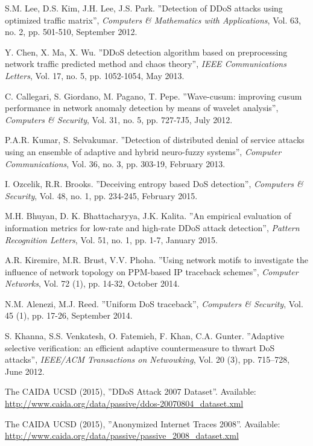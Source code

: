 \begin{thebibliography}{11}
S.M. Lee, D.S. Kim, J.H. Lee, J.S. Park. ''Detection of DDoS attacks using optimized traffic matrix'', \textit{Computers \& Mathematics with Applications}, Vol. 63, no. 2, pp. 501-510, September 2012.

Y. Chen, X. Ma, X. Wu. ''DDoS detection algorithm based on preprocessing network traffic predicted method and chaos theory'', \textit{IEEE Communications Letters}, Vol. 17, no. 5, pp. 1052-1054, May 2013.

C. Callegari, S. Giordano, M. Pagano, T. Pepe. ''Wave-cusum: improving cusum performance in network anomaly detection by means of wavelet analysis'', \textit{Computers \& Security}, Vol. 31, no. 5, pp. 727-7J5, July 2012.

P.A.R. Kumar, S. Selvakumar. ''Detection of distributed denial of service attacks using an ensemble of adaptive and hybrid neuro-fuzzy systems'', \textit{Computer Communications}, Vol. 36, no. 3, pp. 303-19, February 2013.

I. Ozcelik, R.R. Brooks. ''Deceiving entropy based DoS detection'', \textit{Computers \& Security}, Vol. 48, no. 1, pp. 234-245, February 2015.

M.H. Bhuyan, D. K. Bhattacharyya, J.K. Kalita. ''An empirical evaluation of information metrics for low-rate and high-rate DDoS attack detection'', \textit{Pattern Recognition Letters}, Vol. 51, no. 1, pp. 1-7, January 2015.

A.R. Kiremire, M.R. Brust, V.V. Phoha. ''Using network motifs to investigate the influence of network topology on PPM-based IP traceback schemes'', \textit{Computer Networks}, Vol. 72 (1), pp. 14-32, October 2014.

N.M. Alenezi, M.J. Reed. ''Uniform DoS traceback'', \textit{Computers \& Security}, Vol. 45 (1), pp. 17-26, September 2014.

S. Khanna, S.S. Venkatesh, O. Fatemieh, F. Khan, C.A. Gunter. ''Adaptive selective verification: an efficient adaptive countermeasure to thwart DoS attacks'', \textit{IEEE/ACM Transactions on Netwowking}, Vol. 20 (3), pp.  715–728, June 2012.

The CAIDA UCSD (2015), ''DDoS Attack 2007 Dataset''. Available: \url{http://www.caida.org/data/passive/ddos-20070804\_dataset.xml}

The CAIDA UCSD (2015), ''Anonymized Internet Traces 2008''. Available: \url{http://www.caida.org/data/passive/passive\_2008\_dataset.xml}


\end{thebibliography}
